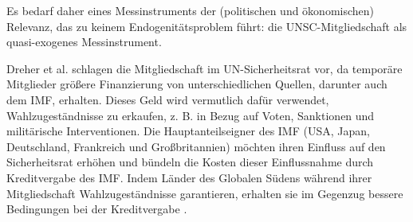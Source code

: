 
Es bedarf daher eines Messinstruments der (politischen und ökonomischen) Relevanz, das zu keinem Endogenitätsproblem führt: die UNSC-Mitgliedschaft als quasi-exogenes Messinstrument.

Dreher et al. schlagen die Mitgliedschaft im UN-Sicherheitsrat vor, da temporäre Mitglieder größere Finanzierung von unterschiedlichen Quellen, darunter auch dem IMF, erhalten. Dieses Geld wird vermutlich dafür verwendet, Wahlzugeständnisse zu erkaufen, z. B. in Bezug auf Voten, Sanktionen und militärische Interventionen. Die Hauptanteilseigner des IMF (USA, Japan, Deutschland, Frankreich und Großbritannien) möchten ihren Einfluss auf den Sicherheitsrat erhöhen und bündeln die Kosten dieser Einflussnahme durch Kreditvergabe des IMF. Indem Länder des Globalen Südens während ihrer Mitgliedschaft Wahlzugeständnisse garantieren, erhalten sie im Gegenzug bessere Bedingungen bei der Kreditvergabe \parencite[121]{DreherPoliticsIMFConditionality2015}.

